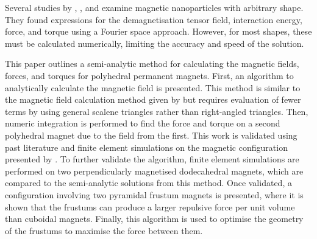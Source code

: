 Several studies by \textcite{Beleggia2003,Beleggia2005}, \textcite{Beleggia2004}, and \textcite{DeGraef2009} examine magnetic nanoparticles with arbitrary shape. They found expressions for the demagnetisation tensor field, interaction energy, force, and torque using a Fourier space approach. However, for most shapes, these must be calculated numerically, limiting the accuracy and speed of the solution.

This paper outlines a semi-analytic method for calculating the magnetic fields, forces, and torques for polyhedral permanent magnets. First, an algorithm to analytically calculate the magnetic field is presented. This method is similar to the magnetic field calculation method given by \textcite{Rubeck2013} but requires evaluation of fewer terms by using general scalene triangles rather than right-angled triangles. Then, numeric integration is performed to find the force and torque on a second polyhedral magnet due to the field from the first. This work is validated using past literature and finite element simulations on the magnetic configuration presented by \textcite{Akoun1984}. To further validate the algorithm, finite element simulations are performed on two perpendicularly magnetised dodecahedral magnets, which are compared to the semi-analytic solutions from this method. Once validated, a configuration involving two pyramidal frustum magnets is presented, where it is shown that the frustums can produce a larger repulsive force per unit volume than cuboidal magnets. Finally, this algorithm is used to optimise the geometry of the frustums to maximise the force between them.